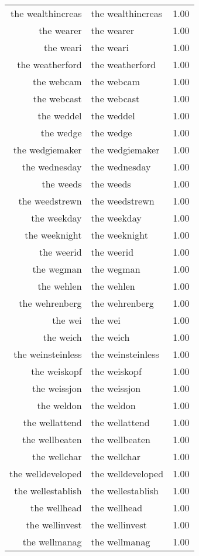 \begin{table}[ht]
\begin{tabular}{rlr}
  the wealthincreas & the wealthincreas & 1.00 \\ 
  the wearer & the wearer & 1.00 \\ 
  the weari & the weari & 1.00 \\ 
  the weatherford & the weatherford & 1.00 \\ 
  the webcam & the webcam & 1.00 \\ 
  the webcast & the webcast & 1.00 \\ 
  the weddel & the weddel & 1.00 \\ 
  the wedge & the wedge & 1.00 \\ 
  the wedgiemaker & the wedgiemaker & 1.00 \\ 
  the wednesday & the wednesday & 1.00 \\ 
  the weeds & the weeds & 1.00 \\ 
  the weedstrewn & the weedstrewn & 1.00 \\ 
  the weekday & the weekday & 1.00 \\ 
  the weeknight & the weeknight & 1.00 \\ 
  the weerid & the weerid & 1.00 \\ 
  the wegman & the wegman & 1.00 \\ 
  the wehlen & the wehlen & 1.00 \\ 
  the wehrenberg & the wehrenberg & 1.00 \\ 
  the wei & the wei & 1.00 \\ 
  the weich & the weich & 1.00 \\ 
  the weinsteinless & the weinsteinless & 1.00 \\ 
  the weiskopf & the weiskopf & 1.00 \\ 
  the weissjon & the weissjon & 1.00 \\ 
  the weldon & the weldon & 1.00 \\ 
  the wellattend & the wellattend & 1.00 \\ 
  the wellbeaten & the wellbeaten & 1.00 \\ 
  the wellchar & the wellchar & 1.00 \\ 
  the welldeveloped & the welldeveloped & 1.00 \\ 
  the wellestablish & the wellestablish & 1.00 \\ 
  the wellhead & the wellhead & 1.00 \\ 
  the wellinvest & the wellinvest & 1.00 \\ 
  the wellmanag & the wellmanag & 1.00 \\ 

\end{tabular}
\end{table}
